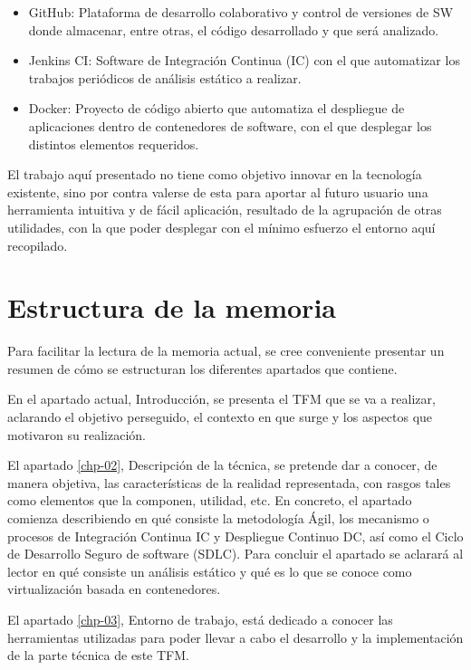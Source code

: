 \begin{itemize}
	\item GitHub\cite{github2017}: Plataforma de desarrollo colaborativo y control de versiones de \gls{SW} donde almacenar, entre otras, el código desarrollado y que será analizado.
	\item Jenkins \gls{CI}\cite{jenkins2017}: Software de Integración Continua (\gls{IC}) con el que automatizar los trabajos periódicos de análisis estático a realizar.
	\item Docker\cite{docker2017}: Proyecto de código abierto que automatiza el despliegue de aplicaciones dentro de contenedores de software, con el que desplegar los distintos elementos requeridos.
\end{itemize}

El trabajo aquí presentado no tiene como objetivo innovar en la tecnología existente, sino por contra valerse de esta para aportar al futuro usuario una herramienta intuitiva y de fácil aplicación, resultado de la agrupación de otras utilidades, con la que poder desplegar con el mínimo esfuerzo el entorno aquí recopilado. 

\section{Estructura de la memoria}


Para facilitar la lectura de la memoria actual, se cree conveniente presentar un resumen de cómo se estructuran los diferentes apartados que contiene.

En el apartado actual, Introducción, se presenta el \gls{TFM} que se va a realizar, aclarando el objetivo perseguido, el contexto en que surge y los aspectos que motivaron su realización.

El apartado \ref{chp-02}, Descripción de la técnica, se pretende dar a conocer, de manera objetiva, las características de la realidad representada, con rasgos tales como elementos que la componen, utilidad, etc. En concreto, el apartado comienza describiendo en qué consiste la metodología Ágil, los mecanismo o procesos de Integración Continua \gls{IC} y Despliegue Continuo \gls{DC}, así como el Ciclo de Desarrollo Seguro de software (\gls{SDLC}). Para concluir el apartado se aclarará al lector en qué consiste un análisis estático y qué es lo que se conoce como virtualización basada en contenedores.

El apartado \ref{chp-03}, Entorno de trabajo, está dedicado a conocer las herramientas utilizadas para poder llevar a cabo el desarrollo y la implementación de la parte técnica de este \gls{TFM}.

